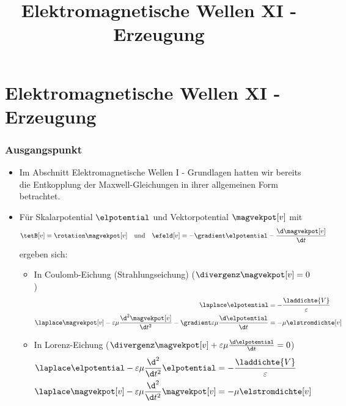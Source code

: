 
  
\title[TET: Elektromagnetische Wellen XI - Erzeugung]{Elektromagnetische Wellen XI - Erzeugung}


% 
% 

\maketitle

% 
% 
\section{Elektromagnetische Wellen XI - Erzeugung}

\begin{frame}
  \frametitle{Ausgangspunkt}
  \begin{itemize}[<+->]
  \item Im Abschnitt \alert{Elektromagnetische Wellen I - Grundlagen} hatten wir bereits die Entkopplung der Maxwell-Gleichungen in ihrer allgemeinen Form betrachtet.
  \item Für \alert{Skalarpotential} \(\elpotential\) und \alert{Vektorpotential} \(\magvekpot[v]\) mit
    \begin{equation*}
      \tetB[v]=\rotation\magvekpot[v] \quad\text{und}\quad \efeld[v]=-\gradient\elpotential -\frac{\d \magvekpot[v]}{\d t}
    \end{equation*}
    ergeben sich:
    \begin{itemize}[<+->]
    \item In \alert{Coulomb-Eichung} (Strahlungseichung) (\(\divergenz \magvekpot[v] =0\))
      \begin{align*}
        \laplace\elpotential &= -\frac{\laddichte{V}}{\varepsilon} \\
        \laplace\magvekpot[v]-\varepsilon\mu\frac{\d^2 \magvekpot[v]}{\d t^2}-\gradient \varepsilon\mu\frac{\d \elpotential}{\d t} &= -\mu \elstromdichte[v]
      \end{align*}
    \item In \alert{Lorenz-Eichung} (\(\divergenz\magvekpot[v] +\varepsilon\mu \frac{\d \elpotential}{\d t}=0\))
      \begin{align*}
\laplace\elpotential-\varepsilon\mu \frac{\d^2}{\d t^2}\elpotential &= -\frac{\laddichte{V}}{\varepsilon}\\
\laplace\magvekpot[v]-\varepsilon\mu \frac{\d^2}{\d t^2}\magvekpot[v] &= -\mu \elstromdichte[v]
\end{align*}

      \end{itemize}
\end{itemize}
\end{frame}

